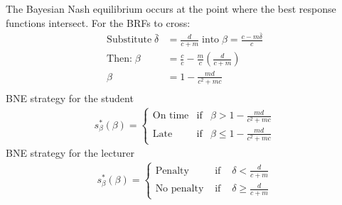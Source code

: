 \documentclass[11pt,preprint, authoryear]{elsarticle}
\numberwithin{equation}{section}
\numberwithin{figure}{section}
\numberwithin{table}{section}
\begin{document}
The Bayesian Nash equilibrium occurs at the point where the best
response functions intersect. For the BRFs to cross: \begin{align*}
\text{Substitute} \; \bar{\delta} &= \frac{d}{c+m} \; \text{into} \; \beta=\frac{c-m\bar{\delta}}{c} \\
\text{Then:} \; \beta&=\frac{c}{c}-\frac{m}{c}\left(\frac{d}{c+m}\right) \\
\beta&=1-\frac{m d}{c^{2}+m c} \\
\end{align*} BNE strategy for the student \begin{align*}
s_{\beta}^{*}(\beta)=\left\{\begin{array}{lll}
\text{On time} & \text{if} & \beta>1-\frac{m d}{c^{2}+m c} \\
\text{Late} & \text{if} & \beta \leqslant 1-\frac{m d}{c^{2}+m c}
\end{array}\right.
\end{align*} BNE strategy for the lecturer \begin{align*}
s_{\beta}^{*}(\beta)=\left\{\begin{array}{lll}
\text{Penalty} & \text { if } & \delta<\frac{d}{c+m} \\
\text{No penalty} & \text { if } & \delta \geq \frac{d}{c+m}
\end{array}\right.
\end{align*}


\end{document}
